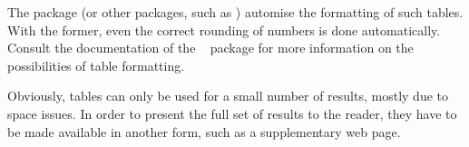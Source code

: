 The  package (or other packages, such as )
automise the formatting of such tables.  With the former, even the correct
rounding of numbers is done automatically.  Consult the documentation of the
~\cite{Wright2016} package for more information on the
possibilities of table formatting.

Obviously, tables can only be used for a small number of results, mostly due to
space issues.  In order to present the full set of results to the reader, they
have to be made available in another form, such as a supplementary web page.
